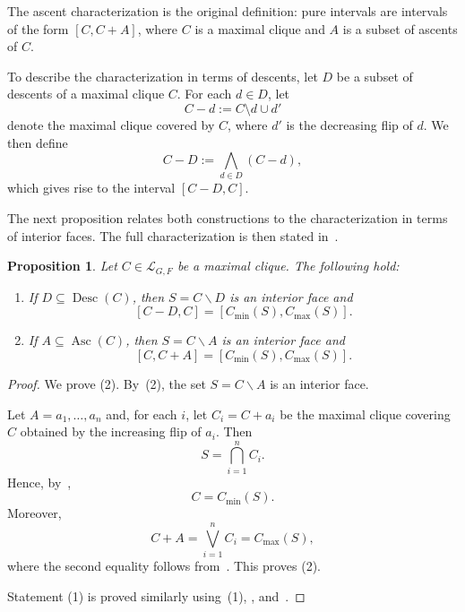 \documentclass[12pt, reqno]{amsart}
\newcommand{\Asc}{\operatorname{Asc}}
\newcommand{\Desc}{\operatorname{Desc}}
\theoremstyle{plain}
\newtheorem{proposition}[theorem]{Proposition}
\theoremstyle{definition}
\numberwithin{equation}{section}
\newcommand\scrL{\mathscr{L}}
\begin{document}
The ascent characterization is the original definition: pure intervals are intervals of the form $[C,C+A]$, where $C$ is a maximal clique and $A$ is a subset of ascents of $C$.

To describe the characterization in terms of descents, let $D$ be a subset of descents of a maximal clique $C$. For each $d\in D$, let
\[
C-d := C\setminus{d}\cup{d'}
\]
denote the maximal clique covered by $C$, where $d'$ is the decreasing flip of $d$. We then define
\[
C-D := \bigwedge_{d\in D}(C-d),
\]
which gives rise to the interval $[C-D,C]$.

The next proposition relates both constructions to the characterization in terms of interior faces. The full characterization is then stated in~.

\begin{proposition}\label{prop_fromPuretoCminCmax}
    Let $C\in \scrL_{G,F}$ be a maximal clique. The following hold:
    \begin{enumerate}
        \item If $D\subseteq \Desc(C)$, then $S=C\smallsetminus D$ is an interior face and
        \[
        [C-D,C]=[C_{\min}(S),C_{\max}(S)].
        \]
        \item If $A\subseteq \Asc(C)$, then $S=C\smallsetminus A$ is an interior face and
        \[
        [C,C+A]=[C_{\min}(S),C_{\max}(S)].
        \]
    \end{enumerate}  
\end{proposition}

\begin{proof}
We prove (2). By~(2), the set $S=C\smallsetminus A$ is an interior face.

Let $A={a_1,\ldots,a_n}$ and, for each $i$, let $C_i=C+a_i$ be the maximal clique covering $C$ obtained by the increasing flip of $a_i$. Then
\[
S=\bigcap_{i=1}^n C_i.
\]
Hence, by~,
\[
C=C_{\min}(S).
\]
Moreover,
\[
C+A=\bigvee_{i=1}^n C_i=C_{\max}(S),
\]
where the second equality follows from~. This proves (2).

Statement (1) is proved similarly using~(1), , and~.
\end{proof}
\end{document}
